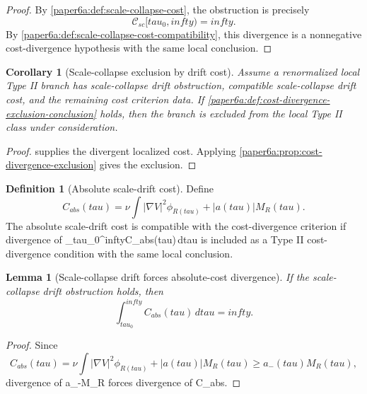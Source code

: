 \documentclass[11pt]{amsart}
\def\({}%
\def\){}%
\def\mathfrak#1{#1}%
\def\mathrm#1{#1}%
\def\tau{tau}%
\def\infty{infty}%
\theoremstyle{plain}
\newtheorem{lemma}[lemma]{Lemma}
\newtheorem{corollary}[corollary]{Corollary}
\theoremstyle{definition}
\newtheorem{definition}[definition]{Definition}
\theoremstyle{remark}
\begin{document}
\begin{proof}
By \cref{paper6a:def:scale-collapse-cost}, the obstruction is precisely
\[
  \mathcal C_{\mathrm{sc}}[\tau_0,\infty)=\infty .
\]
By \cref{paper6a:def:scale-collapse-cost-compatibility}, this divergence is a
nonnegative cost-divergence hypothesis with the same local conclusion.
\end{proof}

\begin{corollary}[Scale-collapse exclusion by drift cost]
\label{paper6a:cor:scale-collapse-drift-exclusion}
Assume a renormalized local Type II branch has scale-collapse drift
obstruction, compatible scale-collapse drift cost, and the remaining cost
criterion data.  If
\cref{paper6a:def:cost-divergence-exclusion-conclusion} holds, then the branch is excluded
from the local Type II class under consideration.
\end{corollary}

\begin{proof}
 supplies the divergent
localized cost.  Applying
\cref{paper6a:prop:cost-divergence-exclusion} gives the exclusion.
\end{proof}

\begin{definition}[Absolute scale-drift cost]\label{paper6a:def:absolute-scale-cost}
Define
\[
  \mathfrak C_{\mathrm{abs}}(\tau)
  =
  \nu\int|\nabla V|^2\phi_{R(\tau)}
  +|a(\tau)|M_R(\tau).
\]
The absolute scale-drift cost is compatible with the cost-divergence criterion
if divergence of
\(\int_{\tau_0}^{\infty}\mathfrak C_{\mathrm{abs}}(\tau)\,d\tau\) is included
as a Type II cost-divergence condition with the same local conclusion.
\end{definition}

\begin{lemma}[Scale-collapse drift forces absolute-cost divergence]
\label{paper6a:lem:scale-drift-absolute}
If the scale-collapse drift obstruction holds, then
\[
  \int_{\tau_0}^{\infty}\mathfrak C_{\mathrm{abs}}(\tau)\,d\tau=\infty .
\]
\end{lemma}

\begin{proof}
Since
\[
  \mathfrak C_{\mathrm{abs}}(\tau)
  =
  \nu\int|\nabla V|^2\phi_{R(\tau)}
  +|a(\tau)|M_R(\tau)
  \ge a_-(\tau)M_R(\tau),
\]
divergence of \(\int a_-M_R\) forces divergence of
\(\int\mathfrak C_{\mathrm{abs}}\).
\end{proof}
\end{document}
